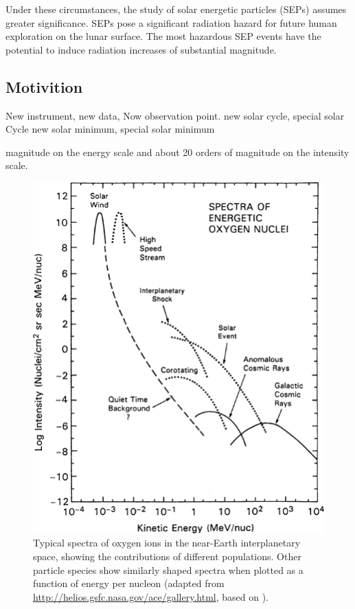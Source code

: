 Under these circumstances, the study of solar energetic particles (SEPs) assumes greater significance. SEPs pose a significant radiation hazard for future human exploration on the lunar surface. The most hazardous SEP events have the potential to induce radiation increases of substantial magnitude.

\subsection{Motivition}
New instrument, new data, 
Now observation point.
new solar cycle, special solar Cycle
new solar minimum, special solar minimum





magnitude on the energy scale and about 20 orders of magnitude on the intensity scale.
\begin{figure}
    \centering
    \includegraphics[width=0.6\linewidth]{images/heliospheric_energy_spectrum}
    \caption[Spectra of oxygen ions in the near-Earth interplanetary space]{Typical spectra of oxygen ions in the near-Earth interplanetary space, showing the contributions of different populations. Other particle species show similarly shaped spectra when plotted as a function of energy per nucleon (adapted from \url{http://helios.gsfc.nasa.gov/ace/gallery.html}, based on \cite{Mewaldt-2001}).}
    \label{fig:heliospheric_energy_spectrum}
\end{figure}
